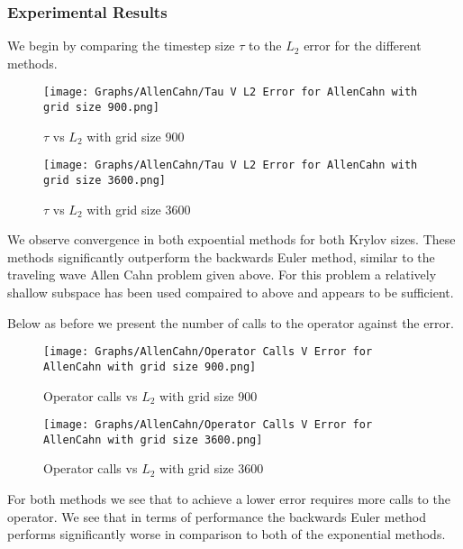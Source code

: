 \subsubsection{Experimental Results}

We begin by comparing the timestep size $\tau$ to the $L_2$ error for the different methods.

\begin{figure}[H]
    \centering
    \begin{minipage}{0.49\textwidth}
        \texttt{[image: Graphs/AllenCahn/Tau V L2 Error for AllenCahn with grid size 900.png]} %
        \caption{$\tau$ vs $L_2$ with grid size 900}
        \label{fig:ACtauE}
    \end{minipage}\hfill
    \centering
    \begin{minipage}{0.49\textwidth}
        \texttt{[image: Graphs/AllenCahn/Tau V L2 Error for AllenCahn with grid size 3600.png]} %
        \caption{$\tau$ vs $L_2$ with grid size 3600}
        \label{fig:ACtauE1024}
    \end{minipage}\hfill
\end{figure}

We observe convergence in both expoential methods for both Krylov sizes.
These methods significantly outperform the backwards Euler method, similar to the traveling wave Allen Cahn problem given above.
For this problem a relatively shallow subspace has been used compaired to above and appears to be sufficient.

Below as before we present the number of calls to the operator against the error.
\begin{figure}[H]
    \centering
    \begin{minipage}{0.49\textwidth}
        \texttt{[image: Graphs/AllenCahn/Operator Calls V Error for AllenCahn with grid size 900.png]} %
        \caption{Operator calls vs $L_2$ with grid size 900}
        \label{fig:plot1}
    \end{minipage}\hfill
    \centering
    \begin{minipage}{0.49\textwidth}
        \texttt{[image: Graphs/AllenCahn/Operator Calls V Error for AllenCahn with grid size 3600.png]} %
        \caption{Operator calls vs $L_2$ with grid size 3600}
        \label{fig:plot2}
    \end{minipage}\hfill
\end{figure}
For both methods we see that to achieve a lower error requires more calls to the operator.
We see that in terms of performance the backwards Euler method performs significantly worse in comparison to both of the exponential methods.

